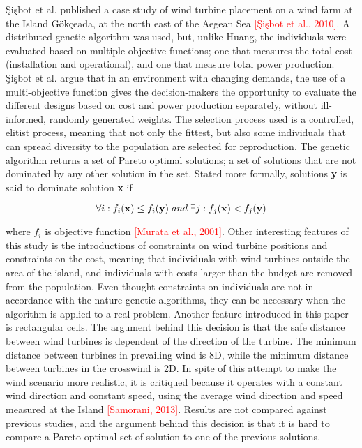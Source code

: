 \noindent \c{S}i\c{s}bot et al. published a case study of wind turbine placement on a wind farm at the Island G{\"o}k\c{c}eada, at the north east of the Aegean Sea \textcolor{red}{[\c{S}i\c{s}bot et al., 2010]}. A distributed genetic algorithm was used, but, unlike Huang, the individuals were evaluated based on multiple objective functions; one that measures the total cost (installation and operational), and one that measure total power production. \c{S}i\c{s}bot et al. argue that in an environment with changing demands, the use of a multi-objective function gives the decision-makers the opportunity to evaluate the different designs based on cost and power production separately, without ill-informed, randomly generated weights. The selection process used is a controlled, elitist process, meaning that not only the fittest, but also some individuals that can spread diversity to the population are selected for reproduction. The genetic algorithm returns a set of Pareto optimal solutions; a set of solutions that are not dominated by any other solution in the set. Stated more formally, solutions \textbf{y} is said to dominate solution \textbf{x} if

\begin{equation}
\forall i: f_i(\textbf{x}) \leq f_i(\textbf{y}) \hspace{1mm} and \hspace{1mm} \exists j: f_j(\textbf{x}) < f_j(\textbf{y}) 
\label{Dominated solutions}
\end{equation}

where $f_i$ is objective function \textcolor{red}{[Murata et al., 2001]}. Other interesting features of this study is the introductions of constraints on wind turbine positions and constraints on the cost, meaning that individuals with wind turbines outside the area of the island, and individuals with costs larger than the budget are removed from the population. Even thought constraints on individuals are not in accordance with the nature genetic algorithms, they can be necessary when the algorithm is applied to a real problem. Another feature introduced in this paper is rectangular cells. The argument behind this decision is that the safe distance between wind turbines is dependent of the direction of the turbine. The minimum distance between turbines in prevailing wind is 8D, while the minimum distance between turbines in the crosswind is 2D. In spite of this attempt to make the wind scenario more realistic, it is critiqued because it operates with a constant wind direction and constant speed, using the average wind direction and speed measured at the Island \textcolor{red}{[Samorani, 2013]}. Results are not compared against previous studies, and the argument behind this decision is that it is hard to compare a Pareto-optimal set of solution to one of the previous solutions. \\



